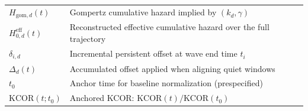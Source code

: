 \documentclass[
]{article}
\begin{document}
\begin{longtable}[]{@{}
  >{\raggedright\arraybackslash}p{}
  >{\raggedright\arraybackslash}p{}@{}}
\(H_{\mathrm{gom},d}(t)\) & Gompertz cumulative hazard implied by
\((k_d,\gamma)\) \\
\(H_{0,d}^{\mathrm{eff}}(t)\) & Reconstructed effective cumulative
hazard over the full trajectory \\
\(\delta_{i,d}\) & Incremental persistent offset at wave end time
\(t_i\) \\
\(\Delta_d(t)\) & Accumulated offset applied when aligning quiet
windows \\
\(t_0\) & Anchor time for baseline normalization (prespecified) \\
\(\mathrm{KCOR}(t; t_0)\) & Anchored KCOR:
\(\mathrm{KCOR}(t)/\mathrm{KCOR}(t_0)\) \\
\end{longtable}

\newpage
\end{document}
